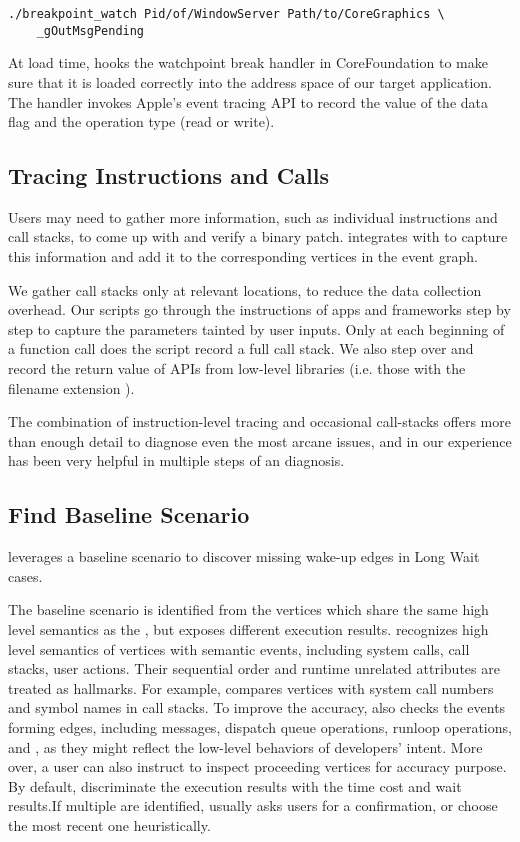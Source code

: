\begin{lstlisting}
./breakpoint_watch Pid/of/WindowServer Path/to/CoreGraphics \
	_gOutMsgPending
\end{lstlisting}

At load time, \xxx hooks the watchpoint break handler in CoreFoundation to
make sure that it is loaded correctly into the address space of our target
application. The handler invokes Apple's event tracing API to record the value
of the data flag and the operation type (read or write).

\subsection{Tracing Instructions and Calls}

Users may need to gather more information, such as individual instructions and
call stacks, to come up with and verify a binary patch. \xxx integrates with
\vv{lldb} to capture this information and add it to the corresponding vertices
in the event graph.

We gather call stacks only at relevant locations, to reduce the data collection
overhead. Our \vv{lldb} scripts go through the instructions of apps and
frameworks step by step to capture the parameters tainted by user inputs. Only
at each beginning of a function call does the script record a full call stack.
We also step over and record the return value of APIs from low-level libraries
(i.e. those with the filename extension \vv{.dylib}).

The combination of instruction-level tracing and occasional call-stacks offers
more than enough detail to diagnose even the most arcane issues, and in our
experience has been very helpful in multiple steps of an \xxx diagnosis.

\subsection{Find Baseline Scenario}

\xxx leverages a baseline scenario to discover missing wake-up edges in
Long Wait cases. 

The baseline scenario is identified from the vertices which share the same high
level semantics as the \spinningnode, but exposes different execution results.
\xxx recognizes high level semantics of vertices with semantic events, including
system calls, call stacks, user actions. Their sequential order and runtime
unrelated attributes are treated as hallmarks. For example, \xxx compares
vertices with system call numbers and symbol names in call stacks. To improve
the accuracy, \xxx also checks the events forming edges, including messages,
dispatch queue operations, runloop operations, \dataflagread and \dataflagwrite,
as they might reflect the low-level behaviors of developers' intent. More over,
a user can also instruct \xxx to inspect proceeding vertices for accuracy
purpose. By default, \xxx discriminate the execution results with the time cost
and wait results.If multiple \similarnode are identified, \xxx usually asks
users for a confirmation, or choose the most recent one heuristically.
